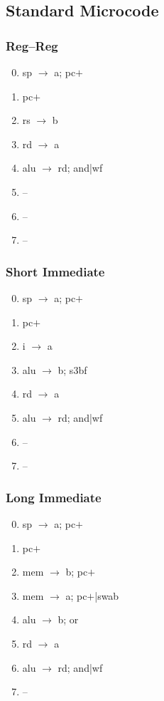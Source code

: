 \documentclass[11pt]{book}
\begin{document}
\subsection*{Standard Microcode}
\begin{multicols}{3}\ttfamily\selectfont\small
  \subsubsection*{Reg--Reg}
  \begin{enumerate}\setcounter{enumi}{-1}
  \item sp \(\rightarrow\) a; pc\(+\)
  \item pc\(+\)
  \item rs \(\rightarrow\) b
  \item rd \(\rightarrow\) a
  \item alu \(\rightarrow\) rd; and|wf
  \item --
  \item --
  \item --
  \end{enumerate}
  \columnbreak
  \subsubsection*{Short Immediate}
  \begin{enumerate}\setcounter{enumi}{-1}
  \item sp \(\rightarrow\) a; pc\(+\)
  \item pc\(+\)
  \item i \(\rightarrow\) a
  \item alu \(\rightarrow\) b; s3bf
  \item rd \(\rightarrow\) a
  \item alu \(\rightarrow\) rd; and|wf
  \item --
  \item --
  \end{enumerate}
  \columnbreak
  \subsubsection*{Long Immediate}
  \begin{enumerate}\setcounter{enumi}{-1}
  \item sp \(\rightarrow\) a; pc\(+\)
  \item pc\(+\)
  \item mem \(\rightarrow\) b; pc\(+\)
  \item mem \(\rightarrow\) a; pc\(+\)|swab
  \item alu \(\rightarrow\) b; or
  \item rd \(\rightarrow\) a
  \item alu \(\rightarrow\) rd; and|wf
  \item --
  \end{enumerate}
\end{multicols}
\end{document}
